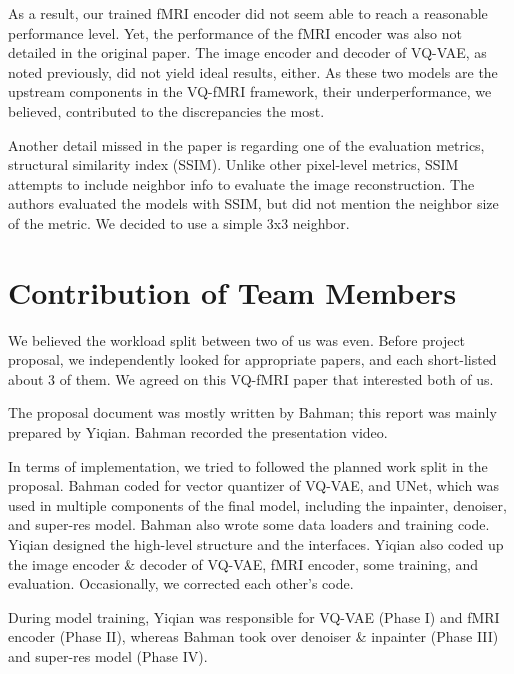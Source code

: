 \documentclass{article}
\theoremstyle{plain}
\theoremstyle{definition}
\theoremstyle{remark}
\begin{document}
As a result, our trained fMRI encoder did not seem able to reach a reasonable performance level. Yet, the performance of the fMRI encoder was also not detailed in the original paper. The image encoder and decoder of VQ-VAE, as noted previously, did not yield ideal results, either. As these two models are the upstream components in the VQ-fMRI framework, their underperformance, we believed, contributed to the discrepancies the most.

Another detail missed in the paper is regarding one of the evaluation metrics, structural similarity index (SSIM). Unlike other pixel-level metrics, SSIM attempts to include neighbor info to evaluate the image reconstruction. The authors evaluated the models with SSIM, but did not mention the neighbor size of the metric. We decided to use a simple 3x3 neighbor.






\section{Contribution of Team Members}
We believed the workload split between two of us was even. Before project proposal, we independently looked for appropriate papers, and each short-listed about 3 of them. We agreed on this VQ-fMRI paper that interested both of us.

The proposal document was mostly written by Bahman; this report was mainly prepared by Yiqian. Bahman recorded the presentation video.

In terms of implementation, we tried to followed the planned work split in the proposal. Bahman coded for vector quantizer of VQ-VAE, and UNet, which was used in multiple components of the final model, including the inpainter, denoiser, and super-res model. Bahman also wrote some data loaders and training code. Yiqian designed the high-level structure and the interfaces. Yiqian also coded up the image encoder \& decoder of VQ-VAE, fMRI encoder, some training, and evaluation. Occasionally, we corrected each other's code.

During model training, Yiqian was responsible for VQ-VAE (Phase I) and fMRI encoder (Phase II), whereas Bahman took over denoiser \& inpainter (Phase III) and super-res model (Phase IV).
\end{document}
